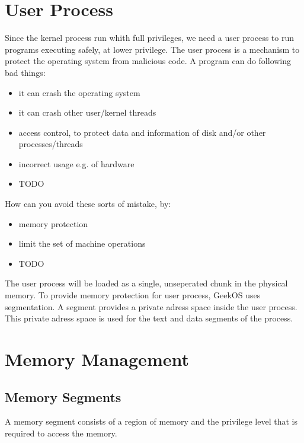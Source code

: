 \section{User Process}

Since the kernel process run whith full privileges, we need a user process to run programs executing safely, at lower privilege.
The user process is a mechanism to protect the operating system from malicious code. A program can do following bad things:
\begin{itemize}
  \item it can crash the operating system
  \item it can crash other user/kernel threads
  \item access control, to protect data and information of disk and/or other processes/threads
  \item incorrect usage e.g. of hardware
  \item TODO
\end{itemize}
How can you avoid these sorts of mistake, by:
\begin{itemize}
  \item memory protection
  \item limit the set of machine operations
  \item TODO
\end{itemize}
The user process will be loaded as a single, unseperated chunk in the physical memory.
To provide memory protection for user process, GeekOS uses segmentation.
A segment provides a private adress space inside the user process. This private adress space is used for the text and data segments of the process.



\section{Memory Management}

\subsection{Memory Segments}
A memory segment consists of a region of memory and the privilege level that is required to access the memory.





